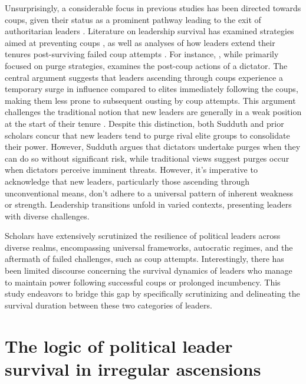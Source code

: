 \documentclass[
  12pt,
  a4paper,
  12pt]{article}
\begin{document}
Unsurprisingly, a considerable focus in previous studies has been
directed towards coups, given their status as a prominent pathway
leading to the exit of authoritarian leaders
\citep{svolik2008, frantz2016}. Literature on leadership survival has
examined strategies aimed at preventing coups
\citep{powell2017, sudduth2017, debruin2020}, as well as analyses of how
leaders extend their tenures post-surviving failed coup attempts
\citep{easton2018}. For instance, \citet{sudduth2017a}, while primarily
focused on purge strategies, examines the post-coup actions of a
dictator. The central argument suggests that leaders ascending through
coups experience a temporary surge in influence compared to elites
immediately following the coups, making them less prone to subsequent
ousting by coup attempts. This argument challenges the traditional
notion that new leaders are generally in a weak position at the start of
their tenure \citep{roessler2011}. Despite this distinction, both
Sudduth and prior scholars concur that new leaders tend to purge rival
elite groups to consolidate their power. However, Sudduth argues that
dictators undertake purges when they can do so without significant risk,
while traditional views suggest purges occur when dictators perceive
imminent threats. However, it's imperative to acknowledge that new
leaders, particularly those ascending through unconventional means,
don't adhere to a universal pattern of inherent weakness or strength.
Leadership transitions unfold in varied contexts, presenting leaders
with diverse challenges.

Scholars have extensively scrutinized the resilience of political
leaders across diverse realms, encompassing universal frameworks,
autocratic regimes, and the aftermath of failed challenges, such as coup
attempts. Interestingly, there has been limited discourse concerning the
survival dynamics of leaders who manage to maintain power following
successful coups or prolonged incumbency. This study endeavors to bridge
this gap by specifically scrutinizing and delineating the survival
duration between these two categories of leaders.

\hypertarget{the-logic-of-political-leader-survival-in-irregular-ascensions}{%
\section{The logic of political leader survival in irregular
ascensions}\label{the-logic-of-political-leader-survival-in-irregular-ascensions}}
\end{document}
